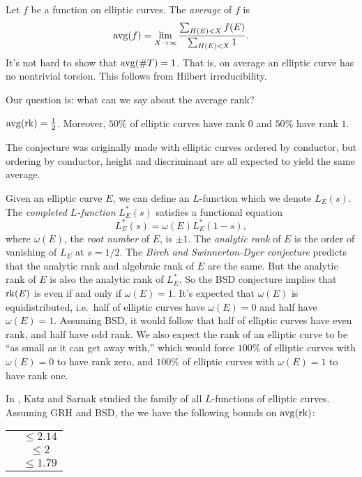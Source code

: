 Let $f$ be a function on elliptic curves. The \emph{average} of $f$ is 
\[
  \operatorname{avg}(f) = \lim_{X\to \infty} \frac{\sum_{H(E)<X} f(E)}{\sum_{H(E)<X} 1} .
\]
It's not hard to show that $\operatorname{avg}(\# T)=1$. That is, on average an elliptic 
curve has no nontrivial torsion. This follows from Hilbert irreducibility. 

Our question is: what can we say about the average rank? 

\begin{conjecture}
$\operatorname{avg}(\operatorname{rk}) = \frac 1 2$. Moreover, $50\%$ of elliptic curves have rank 
$0$ and $50\%$ have rank $1$. 
\end{conjecture}

The conjecture was originally made with elliptic curves ordered by conductor, 
but ordering by conductor, height and discriminant are all expected to yield 
the same average. 

Given an elliptic curve $E$, we can define an $L$-function which we denote 
$L_E(s)$. The \emph{completed $L$-function} $L_E^\ast(s)$ satisfies a 
functional equation 
\[
  L_E^\ast(s) = \omega(E) L_E^\ast(1-s), 
\]
where $\omega(E)$, the \emph{root number} of $E$, is $\pm 1$. The 
\emph{analytic rank} of $E$ is the order of vanishing of $L_E$ at 
$s=1/2$. The \emph{Birch and Swinnerton-Dyer conjecture} predicts that the 
analytic rank and algebraic rank of $E$ are the same. But the analytic 
rank of $E$ is also the analytic rank of $L_E^\ast$. So the BSD conjecture 
implies that $\operatorname{rk}(E)$ is even if and only if $\omega(E)=1$. It's expected 
that $\omega(E)$ is equidistributed, i.e.~half of elliptic curves have 
$\omega(E)=0$ and half have $\omega(E)=1$. Assuming BSD, it would follow 
that half of elliptic curves have even rank, and half have odd rank. We also 
expect the rank of an elliptic curve to be ``as small as it can get away 
with,'' which would force $100\%$ of elliptic curves with $\omega(E)=0$ to 
have rank zero, and $100\%$ of elliptic curves with $\omega(E)=1$ to have rank 
one. 

In \cite{ks99}, Katz and Sarnak studied the family of all $L$-functions of 
elliptic curves. Assuming GRH and BSD, the we have the following bounds on 
$\operatorname{avg}(\operatorname{rk})$:
\begin{center}
\begin{tabular}{c|c}
\cite{b92} & $\leqslant 2.14$ \\
\cite{h04} & $\leqslant 2$ \\
\cite{y06} & $\leqslant 1.79$
\end{tabular}
\end{center}

